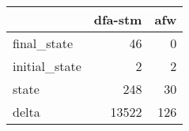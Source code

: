 \begin{tabular}{lrr}
\toprule
{} &  dfa-stm &  afw \\
\midrule
final\_state   &       46 &    0 \\
initial\_state &        2 &    2 \\
state         &      248 &   30 \\
delta         &    13522 &  126 \\
\bottomrule
\end{tabular}
